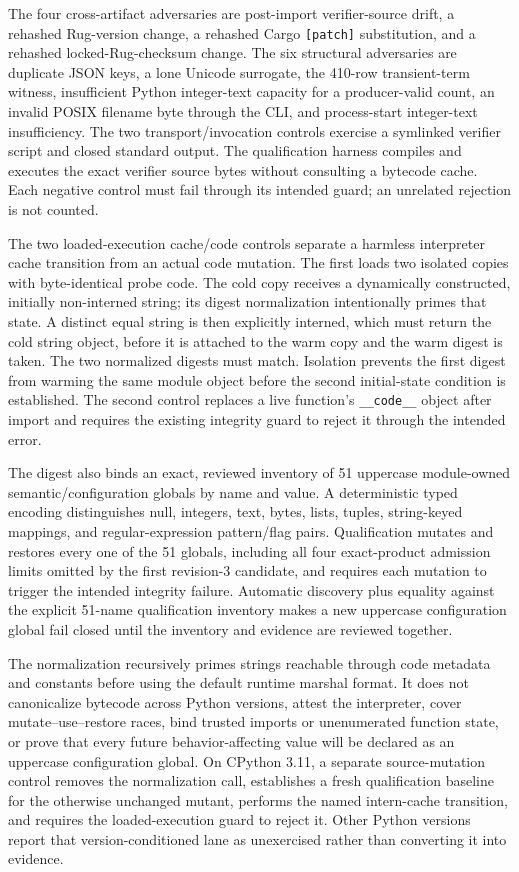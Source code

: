 \documentclass[11pt]{article}
\theoremstyle{definition}
\begin{document}
The four cross-artifact adversaries are post-import verifier-source drift, a rehashed Rug-version
change, a rehashed Cargo \texttt{[patch]} substitution, and a rehashed locked-Rug-checksum change.
The six structural adversaries are duplicate JSON keys, a lone Unicode surrogate, the 410-row
transient-term witness, insufficient Python integer-text capacity for a producer-valid count, an
invalid POSIX filename byte through the CLI, and process-start integer-text insufficiency.  The
two transport/invocation controls exercise a symlinked verifier script and closed standard output.
The qualification harness compiles and executes the exact verifier source bytes without
consulting a bytecode cache.  Each negative control must fail through its intended guard; an
unrelated rejection is not counted.

The two loaded-execution cache/code controls separate a harmless interpreter cache transition
from an actual code mutation.  The first loads two isolated copies with byte-identical probe code.
The cold copy receives a dynamically constructed, initially non-interned string; its digest
normalization intentionally primes that state.  A distinct equal string is then explicitly
interned, which must return the cold string object, before it is attached to the warm copy and the
warm digest is taken.  The two normalized digests must match.  Isolation prevents the first digest
from warming the same module object before the second initial-state condition is established.
The second control replaces a live function's \texttt{\_\_code\_\_} object after import and
requires the existing integrity guard to reject it through the intended error.

The digest also binds an exact, reviewed inventory of 51 uppercase module-owned
semantic/configuration globals by name and value.  A deterministic typed encoding distinguishes
null, integers, text, bytes, lists, tuples, string-keyed mappings, and regular-expression
pattern/flag pairs.  Qualification mutates and restores every one of the 51 globals, including
all four exact-product admission limits omitted by the first revision-3 candidate, and requires
each mutation to trigger the intended integrity failure.  Automatic discovery plus equality
against the explicit 51-name qualification inventory makes a new uppercase configuration global
fail closed until the inventory and evidence are reviewed together.

The normalization recursively primes strings reachable through code metadata and constants before
using the default runtime marshal format.  It does not canonicalize bytecode across Python
versions, attest the interpreter, cover mutate--use--restore races, bind trusted imports or
unenumerated function state, or prove that every future behavior-affecting value will be declared
as an uppercase configuration global.
On CPython 3.11, a separate source-mutation control removes the normalization call, establishes a
fresh qualification baseline for the otherwise unchanged mutant, performs the named intern-cache
transition, and requires the loaded-execution guard to reject it.  Other Python versions report
that version-conditioned lane as unexercised rather than converting it into evidence.
\end{document}
